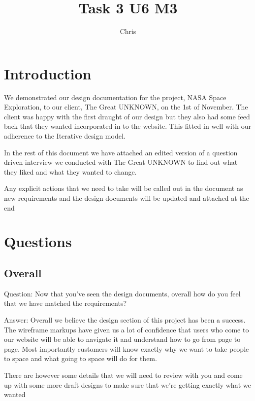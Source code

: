 \documentclass{article}
\title{Task 3 U6 M3}
\author{Chris}
\begin{document}
\maketitle

\tableofcontents


\section{Introduction}
We demonstrated our design documentation for the project, NASA Space Exploration, to our client, The Great UNKNOWN, on the 1st of November. The client was happy with the first draught of our design but they also had some feed back that they wanted incorporated in to the website. This fitted in well with our adherence to the Iterative design model.

In the rest of this document we have attached an edited version of a question driven interview we conducted with The Great UNKNOWN to find out what they liked and what they wanted to change.

Any explicit actions that we need to take will be called out in the document as new requirements and the design documents will be updated and attached at the end

\section{Questions}
\subsection{Overall}
Question: Now that you've seen the design documents, overall how do you feel that we have matched the requirements?


Answer: Overall we believe the design section of this project has been a success. The wireframe markups have given us a lot of confidence that users who come to our website will be able to navigate it and understand how to go from page to page. Most importantly customers will know exactly why we want to take people to space and what going to space will do for them. 

There are however some details that we will need to review with you and come up with some more draft designs to make sure that we're getting exactly what we wanted
\end{document}
